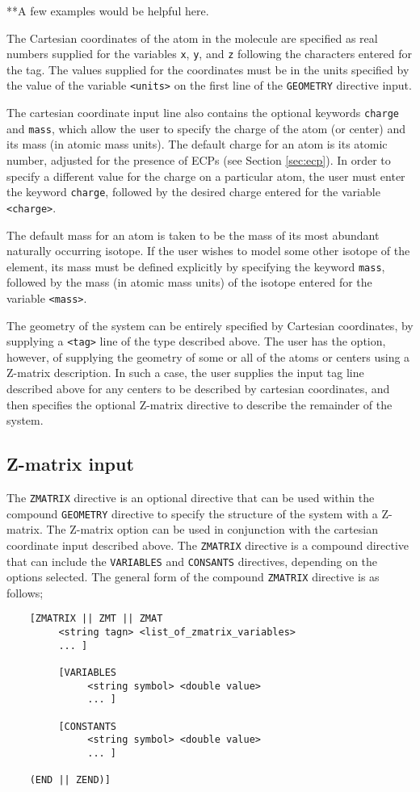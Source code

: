 \Large
**A few examples would be helpful here.
\normalsize

The Cartesian coordinates of the atom in the molecule are specified as
real numbers supplied for the variables \verb+x+, \verb+y+, and \verb+z+
following the characters entered for the tag.
The values supplied for the coordinates must be in the units specified
by the value of the variable \verb+<units>+ on the first line of
the \verb+GEOMETRY+ directive input.

The cartesian coordinate input line also contains the optional
keywords \verb+charge+ and \verb+mass+, which allow the user to
specify the charge of the atom (or center) and its mass (in atomic
mass units).  The default charge for an atom is its atomic number,
adjusted for the presence of ECPs (see Section \ref{sec:ecp}).  In
order to specify a different value for the charge on a particular
atom, the user must enter the keyword \verb+charge+, followed by the
desired charge entered for the variable \verb+<charge>+.

The default mass for an atom is taken to be the mass of its most
abundant naturally occurring isotope.  If the user wishes to model
some other isotope of the element, its mass must be defined explicitly
by specifying the keyword \verb+mass+, followed by the mass (in atomic
mass units) of the isotope entered for the variable \verb+<mass>+.

The geometry of the system can be entirely specified by Cartesian coordinates,
by supplying a \verb+<tag>+ line of the type described above.  The user has
the option, however, of supplying the geometry of some or all of the atoms 
or centers using a Z-matrix description.  In such a case, the user supplies
the input tag line described above for any centers 
to be described by cartesian coordinates, and then specifies the optional
Z-matrix directive to describe the remainder of the system.

\subsection{Z-matrix input}
\label{sec:Z-matrix}

The \verb+ZMATRIX+ directive is an optional directive that can be used within
the compound \verb+GEOMETRY+ directive to specify the structure of the system with a
Z-matrix.  The Z-matrix option can be used in conjunction with the cartesian
coordinate input described above.  The \verb+ZMATRIX+ directive is a compound
directive that can include the \verb+VARIABLES+ and \verb+CONSANTS+
directives, depending on the options selected.  The general form of the 
compound \verb+ZMATRIX+ 
directive is as follows;
\begin{verbatim}
    [ZMATRIX || ZMT || ZMAT
         <string tagn> <list_of_zmatrix_variables> 
         ... ]

         [VARIABLES
              <string symbol> <double value>
              ... ]
 
         [CONSTANTS
              <string symbol> <double value>
              ... ]

    (END || ZEND)]
\end{verbatim}

